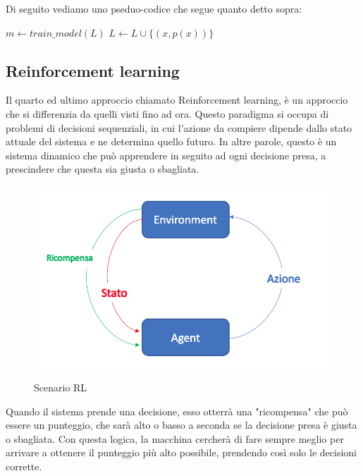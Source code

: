 \documentclass[12pt,italian]{report}
\begin{document}
Di seguito vediamo uno pseduo-codice che segue quanto detto sopra:

\begin{algorithmic}[1]
	\Repeat
	\State $m \gets train\_model(L)$
	\State $L \gets L \cup \{(x, p(x))\}$
	\EndIf
	\EndFor
\end{algorithmic}

\pagebreak
\subsection{Reinforcement learning}
Il quarto ed ultimo approccio chiamato Reinforcement learning, è un approccio che si differenzia da quelli visti fino ad ora. Questo paradigma si occupa di problemi di decisioni sequenziali, in cui l'azione da compiere dipende dallo stato attuale del sistema e ne determina quello futuro. In altre parole, questo è un sistema dinamico che può apprendere in seguito ad ogni decisione presa, a prescindere che questa sia giusta o sbagliata.

\begin{figure}[h!]
	\noindent
	\center
	\label{fig:rl_scenario}
	\includegraphics[scale=0.5]{../img/rl_scenario}
	\caption{Scenario RL}
\end{figure}

Quando il sistema prende una decisione, esso otterrà una "ricompensa" che può essere un punteggio, che sarà alto o basso a seconda se la decisione presa è giusta o sbagliata. Con questa logica, la macchina cercherà di fare sempre meglio per arrivare a ottenere il punteggio più alto possibile, prendendo così solo le decisioni corrette. 
\end{document}

